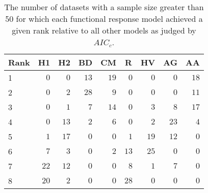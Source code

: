 \begin{table}[!tbp]
\caption{The number of datasets with a sample size greater than 50 for which each functional response model achieved a given rank relative to all other models as judged by $AIC_c$.\label{table:AICc_rankings_top50}} 
\begin{center}
\begin{tabular}{lrrrrrrrr}
\hline\hline
\multicolumn{1}{l}{Rank}&\multicolumn{1}{c}{H1}&\multicolumn{1}{c}{H2}&\multicolumn{1}{c}{BD}&\multicolumn{1}{c}{CM}&\multicolumn{1}{c}{R}&\multicolumn{1}{c}{HV}&\multicolumn{1}{c}{AG}&\multicolumn{1}{c}{AA}\tabularnewline
\hline
1&$ 0$&$ 0$&$13$&$19$&$ 0$&$ 0$&$ 0$&$18$\tabularnewline
2&$ 0$&$ 2$&$28$&$ 9$&$ 0$&$ 0$&$ 0$&$11$\tabularnewline
3&$ 0$&$ 1$&$ 7$&$14$&$ 0$&$ 3$&$ 8$&$17$\tabularnewline
4&$ 0$&$13$&$ 2$&$ 6$&$ 0$&$ 2$&$23$&$ 4$\tabularnewline
5&$ 1$&$17$&$ 0$&$ 0$&$ 1$&$19$&$12$&$ 0$\tabularnewline
6&$ 7$&$ 3$&$ 0$&$ 2$&$13$&$25$&$ 0$&$ 0$\tabularnewline
7&$22$&$12$&$ 0$&$ 0$&$ 8$&$ 1$&$ 7$&$ 0$\tabularnewline
8&$20$&$ 2$&$ 0$&$ 0$&$28$&$ 0$&$ 0$&$ 0$\tabularnewline
\hline
\end{tabular}\end{center}
\end{table}
